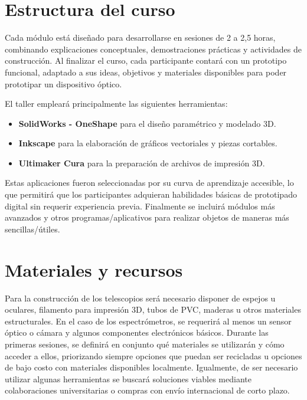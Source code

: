 \documentclass[12pt, twoside]{book}
\begin{document}
	\section*{Estructura del curso}
	
	Cada módulo está diseñado para desarrollarse en sesiones de 2 a 2,5 horas, combinando explicaciones conceptuales, demostraciones prácticas y actividades de construcción.
	Al finalizar el curso, cada participante contará con un prototipo funcional, adaptado a sus ideas, objetivos y materiales disponibles para poder prototipar un dispositivo óptico.
	
	El taller empleará principalmente las siguientes herramientas:
	
	\begin{itemize}
		\item \textbf{SolidWorks - OneShape} para el diseño paramétrico y modelado 3D.
		\item \textbf{Inkscape} para la elaboración de gráficos vectoriales y piezas cortables.
		\item \textbf{Ultimaker Cura} para la preparación de archivos de impresión 3D.
	\end{itemize}
	
	Estas aplicaciones fueron seleccionadas por su curva de aprendizaje accesible, lo que permitirá que los participantes adquieran habilidades básicas de prototipado digital sin requerir experiencia previa. Finalmente se incluirá módulos más avanzados y otros programas/aplicativos para realizar objetos de maneras más sencillas/útiles.
	
	\section*{Materiales y recursos}
	
	Para la construcción de los telescopios será necesario disponer de espejos u oculares, filamento para impresión 3D, tubos de PVC, maderas u otros materiales estructurales.
	En el caso de los espectrómetros, se requerirá al menos un sensor óptico o cámara y algunos componentes electrónicos básicos.
	Durante las primeras sesiones, se definirá en conjunto qué materiales se utilizarán y cómo acceder a ellos, priorizando siempre opciones que puedan ser recicladas u opciones de bajo costo con materiales disponibles localmente. Igualmente, de ser necesario utilizar algunas herramientas se buscará soluciones viables mediante colaboraciones universitarias o compras con envío internacional de corto plazo.
	
\end{document}
